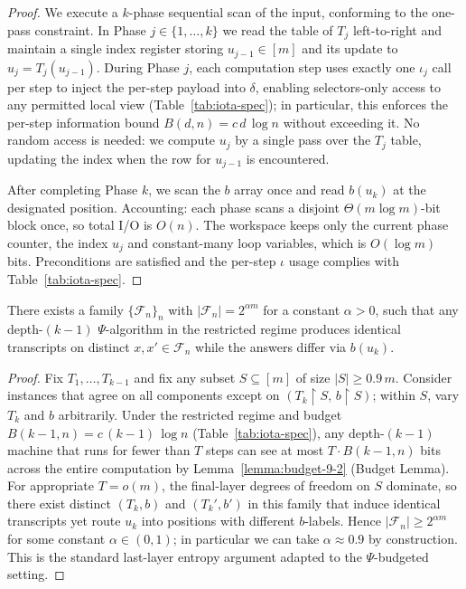 \begin{proof}
We execute a $k$-phase sequential scan of the input, conforming to the one-pass constraint. In Phase $j\in\{1,\dots,k\}$ we read the table of $T_j$ left-to-right and maintain a single index register storing $u_{j-1}\in[m]$ and its update to $u_j=T_j(u_{j-1})$. During Phase $j$, each computation step uses exactly one $\iota_j$ call per step to inject the per-step payload into $\delta$, enabling selectors-only access to any permitted local view (Table~\ref{tab:iota-spec}); in particular, this enforces the per-step information bound $B(d,n)=c\,d\,\log n$ without exceeding it. No random access is needed: we compute $u_j$ by a single pass over the $T_j$ table, updating the index when the row for $u_{j-1}$ is encountered.

After completing Phase $k$, we scan the $b$ array once and read $b(u_k)$ at the designated position. Accounting: each phase scans a disjoint $\Theta(m\log m)$-bit block once, so total I/O is $O(n)$. The workspace keeps only the current phase counter, the index $u_j$ and constant-many loop variables, which is $O(\log m)$ bits. Preconditions are satisfied and the per-step $\iota$ usage complies with Table~\ref{tab:iota-spec}.
\end{proof}

\begin{lemma}
\label{Lk:lem:fooling-Lk}
There exists a family $\{\mathcal{F}_n\}_{n}$ with $\lvert\mathcal{F}_n\rvert = 2^{\alpha m}$ for a constant $\alpha>0$, such that any depth-$(k{-}1)$ $\Psi$-algorithm in the restricted regime produces identical transcripts on distinct $x,x'\in\mathcal{F}_n$ while the answers differ via $b(u_k)$.
\end{lemma}

\begin{proof}
Fix $T_1,\ldots,T_{k-1}$ and fix any subset $S\subseteq[m]$ of size $\lvert S\rvert \ge 0.9\,m$. Consider instances that agree on all components except on $(T_k\upharpoonright S,\, b\upharpoonright S)$; within $S$, vary $T_k$ and $b$ arbitrarily. Under the restricted regime and budget $B(k{-}1,n)=c\,(k{-}1)\,\log n$ (Table~\ref{tab:iota-spec}), any depth-$(k{-}1)$ machine that runs for fewer than $T$ steps can see at most $T\cdot B(k{-}1,n)$ bits across the entire computation by Lemma~\ref{lemma:budget-9-2} (Budget Lemma). For appropriate $T=o(m)$, the final-layer degrees of freedom on $S$ dominate, so there exist distinct $(T_k,b)$ and $(T_k',b')$ in this family that induce identical transcripts yet route $u_k$ into positions with different $b$-labels. Hence $\lvert\mathcal{F}_n\rvert \ge 2^{\alpha m}$ for some constant $\alpha\in(0,1)$; in particular we can take $\alpha\approx 0.9$ by construction. This is the standard last-layer entropy argument adapted to the $\Psi$-budgeted setting.
\end{proof}

